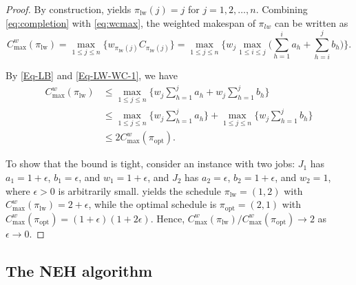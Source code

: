 \documentclass[12pt]{article}
\begin{document}
\begin{sloppypar}
\begin{proof}
            By construction,  yields $\pi_{\mathrm{lw}}(j)=j$ for $j=1, 2, \ldots, n$. Combining \cref{eq:completion} with  \cref{eq:wcmax}, the weighted makespan of $\pi_{lw}$ can be written as 
            \begin{equation}\label{Eq-LW-WC-1}
                C_{\max}^w(\pi_{\mathrm{lw}}) =\max_{1 \leq j \leq n}\Big\{ w_{\pi_{\mathrm{lw}}(j)} C_{\pi_{\mathrm{lw}}(j)}\Big\}=\max_{1 \leq j \leq n} \Big\{w_j \max_{1 \leq i \leq j} \Big (\sum_{h=1}^{i}a_h + \sum_{h=i}^{j}b_h \Big) \Big\}.
            \end{equation}
            
            By \cref{Eq-LB} and \cref{Eq-LW-WC-1}, we have 
            \begin{equation}\label{Eq-LW-WC-2}
                \begin{aligned}
                    C_{\max}^w(\pi_{\mathrm{lw}}) & \leq \max_{1 \leq j \leq n} \Big\{w_j \sum_{h=1}^{j}a_h + w_j \sum_{h=1}^{j}b_h \Big\} \\
                    & \leq \max_{1 \leq j \leq n} \Big\{w_j \sum_{h=1}^{j}a_h \Big\}+\max_{1 \leq j \leq n} \Big\{w_j \sum_{h=1}^{j}b_h \Big\} \\
                    & \leq 2 C_{\max}^w(\pi_{\mathrm{opt}}).
                \end{aligned}
            \end{equation}
            
            To show that the bound is tight, consider an instance with two jobs: $J_1$ has  $a_1=1+\epsilon$, $b_1=\epsilon$, and $w_1= 1+\epsilon$, and $J_2$ has $a_2=\epsilon$, $b_2=1+\epsilon$, and $w_2= 1$, where $\epsilon > 0$ is arbitrarily small.  yields the schedule $\pi_{\mathrm{lw}}=(1,2)$ with $C_{\max}^w(\pi_{\mathrm{lw}})=2+\epsilon$, while the optimal schedule is $\pi_{\mathrm{opt}}=(2,1)$ with $C_{\max}^w(\pi_{\mathrm{opt}})=(1+\epsilon)(1+2\epsilon)$. Hence, $C_{\max}^w(\pi_{\mathrm{lw}})/C_{\max}^w(\pi_{\mathrm{opt}}) \to 2$ as $\epsilon \to 0$.
        \end{proof}
        
        \subsection{The NEH algorithm}
        

\end{sloppypar}
\end{document}
